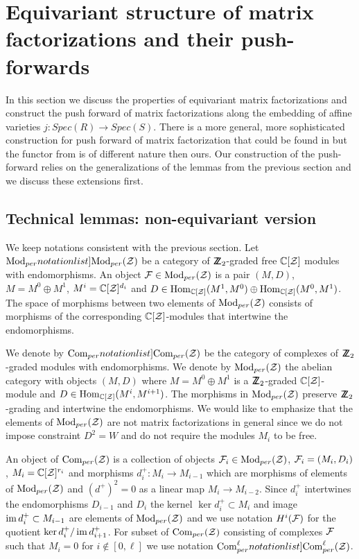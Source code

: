
\section{Equivariant structure of matrix factorizations and their push-forwards}\label{sec: eq push}

In this section we discuss  the properties of equivariant matrix factorizations and construct the push forward of matrix factorizations
along the embedding of affine varieties $j: Spec(R)\to Spec(S)$. There is a more general, more sophisticated
construction for push forward of matrix factorization that could be found in \cite{DM} but the functor from \cite{DM} is of different nature then ours.
Our construction of the push-forward relies on the generalizations of the lemmas from the previous section and we discuss these extensions first.


\subsection{Technical lemmas: non-equivariant version}


We keep notations consistent with the previous section. Let $\SymbolPrint{\Mod_{per}}(\calZ)$ be a category  of $\relax{\sf Z\kern-.4em Z}_2$-graded free $\mathbb{C}[\mathcal{Z}]$ modules with  endomorphisms.
An object $\mathcal{F}\in \mathrm{Mod}_{per}(\mathcal{Z})$ is a pair $(M,D)$, $M=M^0\oplus M^1$, $M^i=\mathbb{C}[\mathcal{Z}]^{d_i}$ and $D\in \mathop{{\rm Hom}}\nolimits_{\mathbb{C}[\mathcal{Z}]}(M^1,M^0)\oplus \mathop{{\rm Hom}}\nolimits_{\mathbb{C}[\mathcal{Z}]}(M^0,M^1)$.
The space of morphisms between two elements of $\mathrm{Mod}_{per}(\mathcal{Z})$ consists of  morphisms of the corresponding   $\mathbb{C}[\mathcal{Z}]$-modules that intertwine the endomorphisms.



We denote by $\SymbolPrint{\Com_{per}}(\calZ)$ be the category of complexes of $\relax{\sf Z\kern-.4em Z}_2$-graded modules with endomorphisms.
We denote by \(\mathrm{Mod}_{per}(\mathcal{Z})\) the abelian category with objects \((M,D)\) where \(M=M^0\oplus M^1\) is a \(\relax{\sf Z\kern-.4em Z}_2\)-graded \(\mathbb{C}[\mathcal{Z}]\)-module
and \(D\in \mathop{{\rm Hom}}\nolimits_{\mathbb{C}[\mathcal{Z}]}(M^i,M^{i+1})\). The morphisms in \(\mathrm{Mod}_{per}(\mathcal{Z})\) preserve \(\relax{\sf Z\kern-.4em Z}_2\)-grading and intertwine the endomorphisms.
We would like to emphasize that the elements of \(\mathrm{Mod}_{per}(\mathcal{Z})\) are not matrix factorizations in general since we do not
impose constraint \(D^2=W\) and do not require the modules \(M_i\) to be free.

An object of
$\mathrm{Com}_{per}(\mathcal{Z})$ is a collection of objects $\mathcal{F}_i\in \mathrm{Mod}_{per}(\mathcal{Z})$, $\mathcal{F}_i=(M_i,D_i)$, $M_i=\mathbb{C}[\mathcal{Z}]^{r_i}$ and morphisms
$d^+_i: M_i\to M_{i-1}$ which are morphisms of elements of $\mathrm{Mod}_{per}(\mathcal{Z})$ and $(d^+)^2=0$ as a  linear map $M_i\to M_{i-2}$.
Since \(d^+_i\) intertwines the endomorphisms \(D_{i-1}\) and \(D_i\) the kernel \(\ker d^+_i\subset M_i \) and image \( \mathop{{\rm im}}\nolimits d^+_i\subset M_{i-1}\) are
elements of \(\mathrm{Mod}_{per}(\mathcal{Z})\) and we use notation $H^i(\mathcal{F})$ for
the quotient \(\ker d^+_i/\mathop{{\rm im}}\nolimits d^+_{i+1}\). For subset of $\mathrm{Com}_{per}(\mathcal{Z})$ consisting of complexes $\mathcal{F}$ such that $M_i=0$ for $i\notin [0,\ell]$
we use notation $\SymbolPrint{\Com^\ell_{per}}(\calZ)$.


